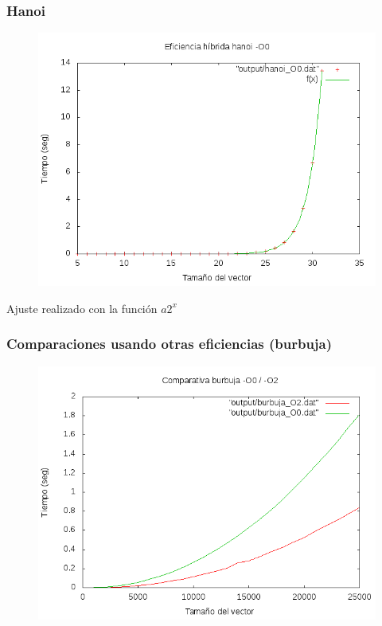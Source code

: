 \documentclass[spanish]{beamer}
\begin{document}
  \begin{frame}\frametitle{Hanoi}
    \begin{figure}[H]
      \centering   
      \includegraphics[clip,width=0.8\columnwidth]{../../plots/hanoi_O0_fit.png}%
    \end{figure}

    Ajuste realizado con la función $a2^x$
  \end{frame}

  
\begin{frame}\frametitle{Comparaciones usando otras eficiencias (burbuja)}
  \begin{figure}[H]
    \centering   
        \includegraphics[clip,width=1\columnwidth]{../../plots/burbuja_comparativa.png}%
      \end{figure}
  \end{frame}
\end{document}
